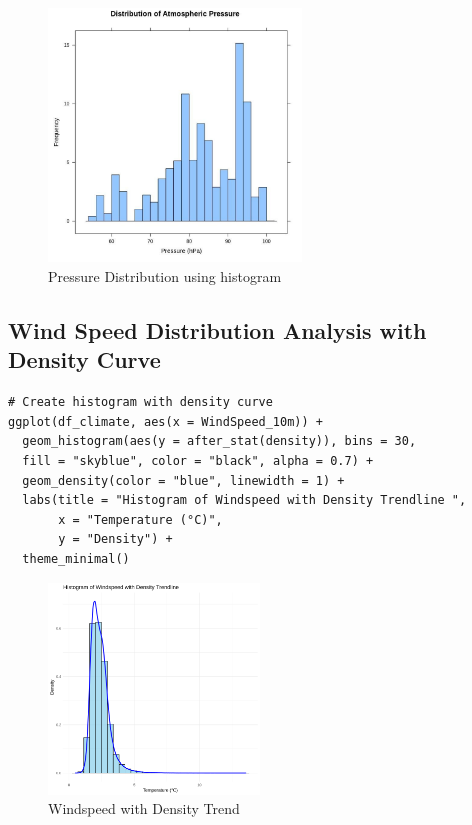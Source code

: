 \begin{figure}[h!]
    \centering
     \includegraphics[width=0.6\textwidth]{figures/hist1.jpg}
    \caption{Pressure Distribution using histogram}
\end{figure}


\subsection*{Wind Speed Distribution Analysis with Density Curve}

\begin{verbatim}
# Create histogram with density curve
ggplot(df_climate, aes(x = WindSpeed_10m)) +
  geom_histogram(aes(y = after_stat(density)), bins = 30, 
  fill = "skyblue", color = "black", alpha = 0.7) + 
  geom_density(color = "blue", linewidth = 1) + 
  labs(title = "Histogram of Windspeed with Density Trendline ",
       x = "Temperature (°C)",
       y = "Density") +
  theme_minimal()
\end{verbatim}

\begin{figure}[h!]
    \centering
     \includegraphics[width=0.5\textwidth]{figures/hist2.png}
    \caption{ Windspeed with Density Trend}
\end{figure}
